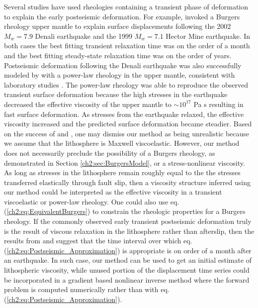 Several studies have used rheologies containing a transient phase of
deformation to explain the early postseismic deformation.  For
example, \citet{Pollitz2003, Pollitz2005} invoked a Burgers rheology
upper mantle to explain surface displacements following the 2002
$M_w=7.9$ Denali earthquake and the 1999 $M_w=7.1$ Hector Mine
earthquake.  In both cases the best fitting transient relaxation time
was on the order of a month and the best fitting steady-state
relaxation time was on the order of years.  Postseismic deformation
following the Denali earthquake was also successfully modeled by
\citet{Freed2006b} with a power-law rheology in the upper mantle,
consistent with laboratory studies \citep[e.g.,][]{Kirby1987}.  The
power-law rheology was able to reproduce the observed transient
surface deformation because the high stresses in the earthquake
decreased the effective viscosity of the upper mantle to $\sim10^{17}$
Pa s resulting in fast surface deformation.  As stresses from the
earthquake relaxed, the effective viscosity increased and the
predicted surface deformation became steadier. Based on the success of
\citet{Pollitz2003, Pollitz2005} and \citet{Freed2006b}, one may
dismiss our method as being unrealistic because we assume that the
lithosphere is Maxwell viscoelastic. However, our method does not
necessarily preclude the possibility of a Burgers rheology, as
demonstrated in Section \ref{ch2:sec:BurgersModel}, or a
stress-nonlinear viscosity.  As long as stresses in the lithosphere
remain roughly equal to the the stresses transferred elastically
through fault slip, then a viscosity structure inferred using our
method could be interpreted as the effective viscosity in a transient
viscoelastic or power-law rheology.  One could also use eq.
(\ref{ch2:eq:EquivalentBurgers}) to constrain the rheologic properties
for a Burgers rheology.  If the commonly observed early transient
postseismic deformation truly is the result of viscous relaxation in
the lithosphere rather than afterslip, then the results from
\citet{Pollitz2003, Pollitz2005} and \citet{Freed2006b} suggest that
the time interval over which eq.
(\ref{ch2:eq:Postseismic_Approximation}) is appropriate is on order of
a month after an earthquake.  In such case, our method can be used to
get an initial estimate of lithospheric viscosity, while unused
portion of the displacement time series could be incorporated in a
gradient based nonlinear inverse method where the forward problem is
computed numerically rather than with eq.
(\ref{ch2:eq:Postseismic_Approximation}).

